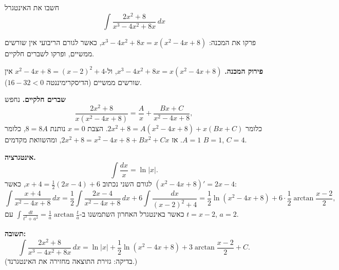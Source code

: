 
\begin{question}
חשבו את האינטגרל
\[ \int \frac{2x^2 + 8}{x^3 - 4x^2 + 8x}\,dx \]
\end{question}

\begin{hint}
פרקו את המכנה: $x^3 - 4x^2 + 8x = x(x^2 - 4x + 8)$, כאשר לגורם הריבועי אין שורשים ממשיים, ופרקו לשברים חלקיים.
\end{hint}

\begin{solution}
\textbf{פירוק המכנה.} $x^3 - 4x^2 + 8x = x(x^2 - 4x + 8)$, ול-$x^2 - 4x + 8 = (x-2)^2 + 4$ אין שורשים ממשיים (הדיסקרימיננטה $16 - 32 < 0$).

\textbf{שברים חלקיים.} נחפש
\[ \frac{2x^2 + 8}{x(x^2 - 4x + 8)} = \frac{A}{x} + \frac{Bx + C}{x^2 - 4x + 8}, \]
כלומר $2x^2 + 8 = A(x^2 - 4x + 8) + x(Bx + C)$. הצבת $x = 0$ נותנת $8 = 8A$, כלומר $A = 1$. אז
$2x^2 + 8 = x^2 - 4x + 8 + Bx^2 + Cx$, ומהשוואת מקדמים $B = 1$, $C = 4$.

\textbf{אינטגרציה.}
\[ \int\frac{dx}{x} = \ln|x|. \]
לגורם השני נכתוב $x + 4 = \frac12(2x - 4) + 6$, כאשר $(x^2 - 4x + 8)' = 2x - 4$:
\[ \int\frac{x+4}{x^2-4x+8}\,dx = \frac12\int\frac{2x-4}{x^2-4x+8}\,dx + 6\int\frac{dx}{(x-2)^2 + 4}
= \frac12\ln(x^2-4x+8) + 6\cdot\frac12\arctan\frac{x-2}{2}, \]
כאשר באינטגרל האחרון השתמשנו ב-$\int\frac{dt}{t^2 + a^2} = \frac1a\arctan\frac ta$ עם $t = x-2$, $a = 2$.

\textbf{תשובה:}
\[ \int \frac{2x^2 + 8}{x^3 - 4x^2 + 8x}\,dx = \ln|x| + \frac12\ln(x^2 - 4x + 8) + 3\arctan\frac{x-2}{2} + C. \]
(בדיקה: גזירת התוצאה מחזירה את האינטגרנד.)
\end{solution}
